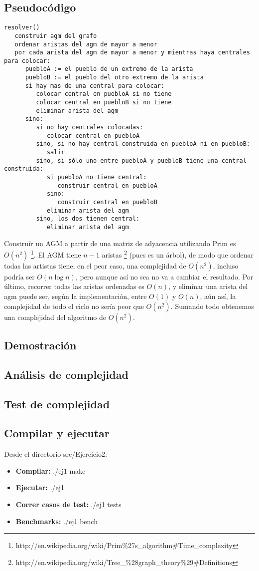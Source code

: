 \subsection{Pseudoc\'odigo}
\begin{verbatim}
resolver()
   construir agm del grafo
   ordenar aristas del agm de mayor a menor
   por cada arista del agm de mayor a menor y mientras haya centrales para colocar:
      puebloA := el pueblo de un extremo de la arista
      puebloB := el pueblo del otro extremo de la arista
      si hay mas de una central para colocar:
         colocar central en puebloA si no tiene
         colocar central en puebloB si no tiene
         eliminar arista del agm
      sino:
         si no hay centrales colocadas:
            colocar central en puebloA
         sino, si no hay central construida en puebloA ni en puebloB:
            salir
         sino, si sólo uno entre puebloA y puebloB tiene una central construida:
            si puebloA no tiene central:
               construir central en puebloA
            sino:
               construir central en puebloB
            eliminar arista del agm
         sino, los dos tienen central:
            eliminar arista del agm

\end{verbatim}

Construír un AGM a partir de una matriz de adyacencia utilizando Prim es $O(n^2)$ \footnote{http://en.wikipedia.org/wiki/Prim\%27s\_algorithm\#Time\_complexity}.
El AGM tiene $n-1$ aristas \footnote{http://en.wikipedia.org/wiki/Tree\_\%28graph\_theory\%29\#Definitions} (pues es un árbol), de modo que ordenar
todas las artistas tiene, en el peor caso, una complejidad de $O(n^2)$, incluso podría ser $O(n \log n)$, pero aunque así no sea no va a cambiar el resultado.
Por último, recorrer todas las aristas ordenadas es $O(n)$, y eliminar una arista del agm puede ser, según la implementación, entre $O(1)$ y $O(n)$, aún así, la complejidad de todo el ciclo no sería peor que $O(n^2)$. Sumando todo obtenemos una complejidad del algoritmo de $O(n^2)$.

\subsection{Demostraci\'on}

\subsection{An\'alisis de complejidad}

\subsection{Test de complejidad}

\subsection{Compilar y ejecutar}
Desde el directorio src/Ejercicio2:
\begin{itemize}
   \item {\bf Compilar:} ./ej1 make
   \item {\bf Ejecutar:} ./ej1
   \item {\bf Correr casos de test:} ./ej1 tests
   \item {\bf Benchmarks:} ./ej1 bench
\end{itemize}
